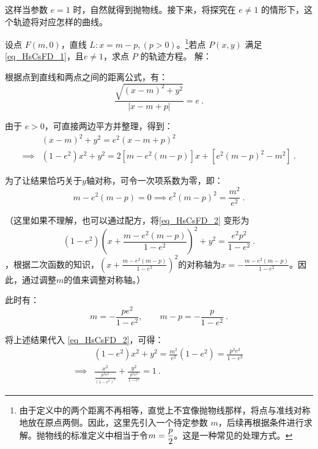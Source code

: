 这样当参数 $e = 1$ 时，自然就得到抛物线。接下来，将探究在 $e \ne 1$ 的情形下，这个轨迹将对应怎样的曲线。

\begin{example}{设点 $F(m,0)$，直线 $L : x = m - p,(p>0)$。\footnote{由于定义中的两个距离不再相等，直觉上不宜像抛物线那样，将点与准线对称地放在原点两侧。因此，这里先引入一个待定参数 $m$，后续再根据条件进行求解。抛物线的标准定义中相当于令$\displaystyle m={p\over2}$。这是一种常见的处理方式。}若点 $P(x,y)$ 满足 \autoref{eq_HsCsFD_1}，且$e\neq 1$，求点 $P$ 的轨迹方程。}\label{ex_HsCsFD_1}
解：

根据点到直线和两点之间的距离公式，有：
\begin{equation}\label{eq_HsCsFD_7}
\frac{\sqrt{(x - m)^2 + y^2}}{|x - m + p|} = e~.
\end{equation}

由于 $e > 0$，可直接两边平方并整理，得到：
\begin{equation}\label{eq_HsCsFD_2}
\begin{split}
&(x - m)^2 + y^2 = e^2(x - m + p)^2\\
\implies &(1 - e^2)x^2 + y^2 = 2[m - e^2(m - p)]x + [e^2(m - p)^2 - m^2]~.
\end{split}
\end{equation}

为了让结果恰巧关于$y$轴对称，可令一次项系数为零，即：
\begin{equation}
m - e^2(m - p) = 0\implies e^2(m - p)^2 = \frac{m^2}{e^2}~.
\end{equation}

（这里如果不理解，也可以通过配方，将\autoref{eq_HsCsFD_2} 变形为
\begin{equation}\label{eq_HsCsFD_9}
(1 - e^2)\left(x+\frac{m-e^2(m-p)}{1-e^2}\right)^2 + y^2 = \frac{e^2 p^2}{1 - e^2}~.
\end{equation}
，根据二次函数的知识，$\displaystyle\left(x+\frac{m-e^2(m-p)}{1-e^2}\right)^2$的对称轴为$\displaystyle x=-\frac{m-e^2(m-p)}{1-e^2}$。因此，通过调整$m$的值来调整对称轴。）

此时有：
\begin{equation}\label{eq_HsCsFD_5}
m = -\frac{pe^2}{1 - e^2}, \qquad m-p= -\frac{p}{1 - e^2}~.
\end{equation}

将上述结果代入 \autoref{eq_HsCsFD_2}，可得：
\begin{equation}\label{eq_HsCsFD_3}
\begin{split}
&(1 - e^2)x^2 + y^2 = \frac{m^2}{e^2}(1 - e^2) = \frac{p^2 e^2}{1 - e^2}\\
\implies&\frac{x^2}{\displaystyle\frac{p^2 e^2}{(1 - e^2)^2}} + \frac{y^2}{\displaystyle\frac{p^2 e^2}{1 - e^2}} = 1~.
\end{split}
\end{equation}


\end{example}
